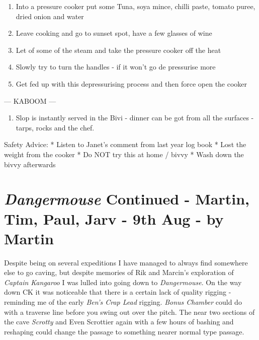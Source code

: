 \begin{enumerate}
\def\labelenumi{\arabic{enumi}.}
\tightlist
\item
  Into a pressure cooker put some Tuna, soya mince, chilli paste, tomato
  puree, dried onion and water
\item
  Leave cooking and go to sunset spot, have a few glasses of wine
\item
  Let of some of the steam and take the pressure cooker off the heat
\item
  Slowly try to turn the handles - if it won't go de pressurise more
\item
  Get fed up with this depressurising process and then force open the
  cooker
\end{enumerate}

--- KABOOM ---

\begin{enumerate}
\def\labelenumi{\arabic{enumi}.}
\setcounter{enumi}{5}
\tightlist
\item
  Slop is instantly served in the Bivi - dinner can be got from all the
  surfaces - tarps, rocks and the chef.
\end{enumerate}

Safety Advice: * Listen to Janet's comment from last year log book *
Lost the weight from the cooker * Do NOT try this at home / bivvy * Wash
down the bivvy afterwards


\hypertarget{dangermouse-continued---martin-tim-paul-jarv---9th-aug---by-martin}{%
\section{\texorpdfstring{\emph{Dangermouse} Continued - Martin, Tim,
Paul, Jarv - 9th Aug - by
Martin}{Dangermouse Continued - Martin, Tim, Paul, Jarv - 9th Aug - by Martin}}\label{dangermouse-continued---martin-tim-paul-jarv---9th-aug---by-martin}}

Despite being on several expeditions I have managed to always find
somewhere else to go caving, but despite memories of Rik and Marcin's
exploration of \emph{Captain Kangaroo} I was lulled into going down to
\emph{Dangermouse}. On the way down CK it was noticeable that there is a
certain lack of quality rigging - reminding me of the early \emph{Ben's
Crap Lead}
rigging. \emph{Bonus Chamber} could do with a traverse line before you
swing out over the pitch. The near two sections of the cave
\emph{Scrotty} and Even Scrottier again with a few hours of bashing and
reshaping could change the passage to something nearer normal type
passage.

